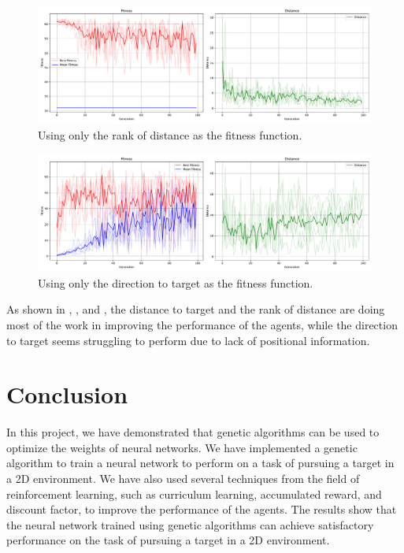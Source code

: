 \documentclass[sigconf]{acmart}
\begin{document}
\begin{figure}[H]
  \centering
  \includegraphics[width=0.95\linewidth]{imgs/result_Run_cx0.85_mut0.25_2024_1214_0634_rank_only.pdf}
  \caption{Using only the rank of distance as the fitness function.}
  \label{fig:plot_rank}
\end{figure}

\begin{figure}[H]
  \centering
  \includegraphics[width=0.95\linewidth]{imgs/result_Run_cx0.85_mut0.25_2024_1214_0636_dir_only.pdf}
  \caption{Using only the direction to target as the fitness function.}
  \label{fig:plot_dir}
\end{figure}
As shown in , , and , the distance to target and the rank of distance are doing most of the work in improving the performance of the agents, while the direction to target seems struggling to perform due to lack of positional information.

\section{Conclusion}
In this project, we have demonstrated that genetic algorithms can be used to optimize the weights of neural networks. We have implemented a genetic algorithm to train a neural network to perform on a task of pursuing a target in a 2D environment. We have also used several techniques from the field of reinforcement learning, such as curriculum learning, accumulated reward, and discount factor, to improve the performance of the agents. The results show that the neural network trained using genetic algorithms can achieve satisfactory performance on the task of pursuing a target in a 2D environment.



\end{document}
